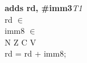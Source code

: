 


\begin{instructionblock}{\imagewidth}%
    \textbf{adds rd, \#imm3}\hfill\textit{T1}\\
    rd $\in$ \baseregisters\\
    imm8 $\in$ \immEight\\
    {N Z C V}\\
    rd = rd + imm8;
\end{instructionblock}

